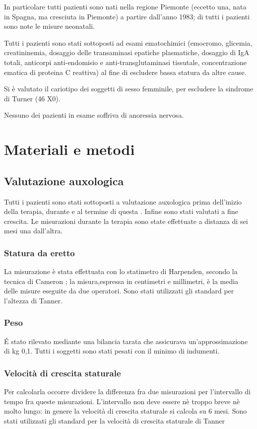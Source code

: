 In particolare tutti pazienti sono nati nella regione Piemonte (eccetto una, nata in Spagna, ma cresciuta in Piemonte) a partire dall'anno 1983; di tutti i pazienti sono note le misure neonatali.

Tutti i pazienti sono stati sottoposti ad esami ematochimici (emocromo, glicemia, creatininemia, dosaggio delle transaminasi epatiche plasmatiche, dosaggio di IgA totali, anticorpi anti-endomisio e anti-transglutaminasi tissutale, concentrazione ematica di proteina C reattiva) al fine di escludere bassa statura da altre cause. 

Si è valutato il cariotipo dei soggetti di sesso femminile, per escludere la sindrome di Turner (46 X0). 

Nessuno dei pazienti in esame soffriva di anoressia nervosa.


\section{Materiali e metodi}

\subsection{Valutazione auxologica}
Tutti i pazienti sono stati sottoposti a valutazione auxologica prima dell'inizio della terapia, durante e al termine di questa . Infine sono stati valutati a fine crescita. Le misurazioni durante la terapia sono state effettuate a distanza di sei mesi una dall'altra.

\subsubsection*{Statura da eretto}
 La misurazione è stata effettuata con lo statimetro di Harpenden, secondo la tecnica di Cameron%
; la misura,espressa in centimetri e millimetri, è la media delle misure eseguite da due operatori. Sono stati utilizzati gli standard per l'altezza di Tanner.%

  
\subsubsection*{Peso}
 \'E stato rilevato mediante una bilancia tarata che assicurava un'approssimazione di kg 0,1. Tutti i soggetti sono stati pesati con il minimo di indumenti.

\subsubsection*{Velocità di crescita staturale}
Per calcolarla occorre dividere la differenza fra due misurazioni per l'intervallo di tempo fra queste misurazioni. L'intervallo non deve essere nè troppo breve nè molto lungo: in genere la velocità di crescita staturale si calcola su 6 mesi. Sono stati utilizzati gli standard per la velocità di crescita staturale di Tanner%

